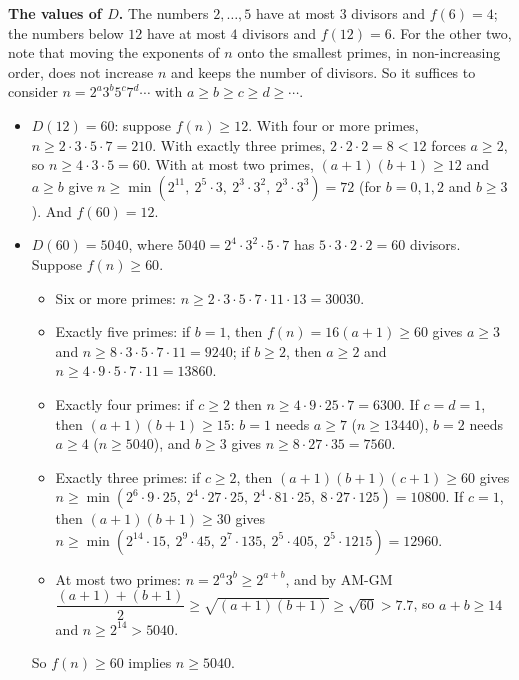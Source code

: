 \textbf{The values of $D$.} The numbers $2,\dots,5$ have at most $3$ divisors and $f(6)=4$; the numbers below $12$ have at most $4$ divisors and $f(12)=6$. For the other two, note that moving the exponents of $n$ onto the smallest primes, in non-increasing order, does not increase $n$ and keeps the number of divisors. So it suffices to consider $n=2^a3^b5^c7^d\cdots$ with $a\ge b\ge c\ge d\ge\cdots$.
\begin{itemize}
\item $D(12)=60$: suppose $f(n)\ge12$. With four or more primes, $n\ge2\cdot3\cdot5\cdot7=210$. With exactly three primes, $2\cdot2\cdot2=8<12$ forces $a\ge2$, so $n\ge4\cdot3\cdot5=60$. With at most two primes, $(a+1)(b+1)\ge12$ and $a\ge b$ give $n\ge\min\left(2^{11},\ 2^5\cdot3,\ 2^3\cdot3^2,\ 2^3\cdot3^3\right)=72$ (for $b=0,1,2$ and $b\ge3$). And $f(60)=12$.
\item $D(60)=5040$, where $5040=2^4\cdot3^2\cdot5\cdot7$ has $5\cdot3\cdot2\cdot2=60$ divisors. Suppose $f(n)\ge60$.
\begin{itemize}
\item Six or more primes: $n\ge2\cdot3\cdot5\cdot7\cdot11\cdot13=30030$.
\item Exactly five primes: if $b=1$, then $f(n)=16(a+1)\ge60$ gives $a\ge3$ and $n\ge8\cdot3\cdot5\cdot7\cdot11=9240$; if $b\ge2$, then $a\ge2$ and $n\ge4\cdot9\cdot5\cdot7\cdot11=13860$.
\item Exactly four primes: if $c\ge2$ then $n\ge4\cdot9\cdot25\cdot7=6300$. If $c=d=1$, then $(a+1)(b+1)\ge15$: $b=1$ needs $a\ge7$ ($n\ge13440$), $b=2$ needs $a\ge4$ ($n\ge5040$), and $b\ge3$ gives $n\ge8\cdot27\cdot35=7560$.
\item Exactly three primes: if $c\ge2$, then $(a+1)(b+1)(c+1)\ge60$ gives $n\ge\min(2^6\cdot9\cdot25,\ 2^4\cdot27\cdot25,\ 2^4\cdot81\cdot25,\ 8\cdot27\cdot125)=10800$. If $c=1$, then $(a+1)(b+1)\ge30$ gives $n\ge\min(2^{14}\cdot15,\ 2^9\cdot45,\ 2^7\cdot135,\ 2^5\cdot405,\ 2^5\cdot1215)=12960$.
\item At most two primes: $n=2^a3^b\ge2^{a+b}$, and by AM-GM $\dfrac{(a+1)+(b+1)}{2}\ge\sqrt{(a+1)(b+1)}\ge\sqrt{60}>7.7$, so $a+b\ge14$ and $n\ge2^{14}>5040$.
\end{itemize}
So $f(n)\ge60$ implies $n\ge5040$.
\end{itemize}
